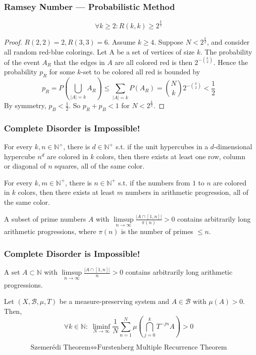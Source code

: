 \documentclass[UTF8,11pt,colorlinks,compress,openany]{beamer}%
\begin{document}
\begin{frame}\frametitle{Ramsey Number --- Probabilistic Method}
	\begin{theorem}		
		\[\forall k\geq 2: R(k,k)\geq 2^{\frac{k}{2}}\]
	\end{theorem}
	\begin{proof}
		$R(2,2)=2, R(3,3)=6$. Assume $k\geq 4$. Suppose $N<2^{\frac{k}{2}}$, and consider all random red-blue colorings. Let A be a set of vertices of size $k$. The probability of the event $A_R$ that the edges in $A$ are all colored red is then $2^{-\binom{k}{2}}$. Hence the probability $p_R$ for some $k$-set to be colored all red is bounded by
		\[p_R=P\left(\bigcup\limits_{|A|=k}A_R\right)\leq\sum\limits_{|A|=k}P(A_R)=\binom{N}{k}2^{-\binom{k}{2}}<\dfrac{1}{2}\]
		By symmetry, $p_B<\frac{1}{2}$. So $p_R+p_B<1$ for $N<2^{\frac{k}{2}}$.
	\end{proof}
\end{frame}

\begin{frame}\frametitle{Complete Disorder is Impossible!}
	\begin{theorem}
		For every $k,n\in\mathbb{N}^+$, there is $d\in\mathbb{N}^+$ s.t. if the unit hypercubes in a $d$-dimensional hypercube $n^d$ are colored in $k$ colors, then there exists at least one row, column or diagonal of $n$ squares, all of the same color.
	\end{theorem}
	\begin{theorem}
		For every $k,m\in\mathbb{N}^+$, there is $n\in\mathbb{N}^+$ s.t. if the numbers from $1$ to $n$ are colored in $k$ colors, then there exists at least $m$ numbers in arithmetic progression, all of the same color.
	\end{theorem}
	\begin{theorem}
		A subset of prime numbers $A$ with $\limsup\limits_{n\to\infty}\frac{|A\cap[1,n]|}{\pi(n)}>0$ contains arbitrarily long arithmetic progressions, where $\pi(n)$ is the number of primes $\leq n$.
	\end{theorem}
\end{frame}

\begin{frame}\frametitle{Complete Disorder is Impossible!}
\setlength\abovedisplayskip{0pt}
	\begin{theorem}
		A set $A\subset\mathbb{N}$ with $\limsup\limits_{n\to\infty}{\frac {|A\cap [1,n]|}{n}}>0$ contains arbitrarily long arithmetic progressions.
	\end{theorem}
	\begin{theorem}
		Let $(X,{\mathcal{B}},\mu,T)$ be a measure-preserving system and $A\in\mathcal{B}$ with $\mu(A) > 0$. Then,
		\[\forall k\in\mathbb{N}:\;\liminf\limits_{N\to\infty}\dfrac{1}{N}\sum\limits_{n=1}^N\mu\left(\bigcap\limits_{j=0}^k T^{-jn}A\right)>0\]
	\end{theorem}
	\[\text{Szemer\'edi Theorem}\iff\text{Furstenberg Multiple Recurrence Theorem}\]
\end{frame}
\end{document}
